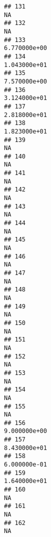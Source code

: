 \documentclass[
]{article}
\begin{document}
\begin{verbatim}
## 131                                                                         NA
## 132                                                                         NA
## 133                                                               6.770000e+00
## 134                                                               1.043000e+01
## 135                                                               7.570000e+00
## 136                                                               3.124000e+01
## 137                                                               2.818000e+01
## 138                                                               1.823000e+01
## 139                                                                         NA
## 140                                                                         NA
## 141                                                                         NA
## 142                                                                         NA
## 143                                                                         NA
## 144                                                                         NA
## 145                                                                         NA
## 146                                                                         NA
## 147                                                                         NA
## 148                                                                         NA
## 149                                                                         NA
## 150                                                                         NA
## 151                                                                         NA
## 152                                                                         NA
## 153                                                                         NA
## 154                                                                         NA
## 155                                                                         NA
## 156                                                               9.000000e+00
## 157                                                               8.430000e+01
## 158                                                               6.000000e-01
## 159                                                               1.640000e+01
## 160                                                                         NA
## 161                                                                         NA
## 162                                                                         NA

\end{verbatim}
\end{document}
